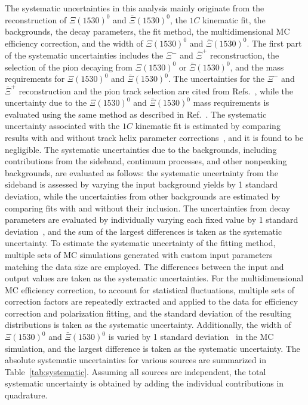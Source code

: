 \documentclass[prd,aps,reprint,noeprint,superscriptaddress,amsmath, amssymb]{revtex4-1}
\newcommand{\Xs}{\Xi(1530)^0}
\newcommand{\Xsb}{\bar\Xi(1530)^0}
\begin{document}
The systematic uncertainties in this analysis mainly originate from the reconstruction of $\Xs$ and $\Xsb$, the $1C$ kinematic fit, the backgrounds, the decay parameters, the fit method, the multidimensional MC efficiency correction, and the width of $\Xs$ and $\Xsb$.
The first part of the systematic uncertainties includes the $\Xi^-$ and $\bar\Xi^+$ reconstruction, the selection of the pion decaying from $\Xs$ or $\Xsb$, and the mass requirements for $\Xs$ and $\Xsb$. The uncertainties for the $\Xi^-$ and $\bar\Xi^+$ reconstruction and the pion track selection are cited from Refs.~\cite{BESIII:2022lsz,Liu:2024uno}, while the uncertainty due to the $\Xs$ and $\Xsb$ mass requirements is evaluated using the same method as described in Ref.~\cite{BESIII:2020fqg}.
The systematic uncertainty associated with the $1C$ kinematic fit is estimated by comparing results with and without track helix parameter corrections~\cite{BESIII:2024jgy}, and it is found to be negligible.
The systematic uncertainties due to the backgrounds, including contributions from the sideband, continuum processes, and other nonpeaking backgrounds, are evaluated as follows: the systematic uncertainty from the sideband is assessed by varying the input background yields by 1 standard deviation, while the uncertainties from other backgrounds are estimated by comparing fits with and without their inclusion.
The uncertainties from decay parameters are evaluated by individually varying each fixed value by 1 standard deviation~\cite{BESIII:2021ypr,BESIII:2022qax}, and the sum of the largest differences is taken as the systematic uncertainty.
To estimate the systematic uncertainty of the fitting method, multiple sets of MC simulations generated with custom input parameters matching the data size are employed. The differences between the input and output values are taken as the systematic uncertainties.
For the multidimensional MC efficiency correction, to account for statistical fluctuations, multiple sets of correction factors are repeatedly extracted and applied to the data for efficiency correction and polarization fitting, and the standard deviation of the resulting distributions is taken as the systematic uncertainty.
Additionally, the width of $\Xs$ and $\Xsb$ is varied by 1 standard deviation~\cite{ParticleDataGroup:2024cfk} in the MC simulation, and the largest difference is taken as the systematic uncertainty.
The absolute systematic uncertainties for various sources are summarized in Table~\ref{tab:systematic}.
Assuming all sources are independent, the total systematic uncertainty is obtained by adding the individual contributions in quadrature.
\end{document}
